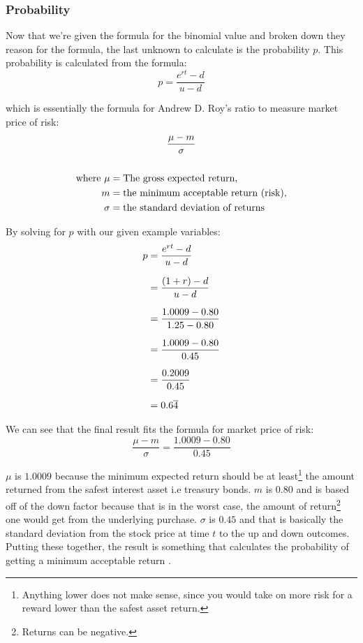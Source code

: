 \documentclass[12pt, letterpaper]{article}\usepackage{float}
\begin{document}
\subsubsection*{Probability}
Now that we're given the formula for the binomial value and broken down they reason for the formula, the last unknown to calculate is the probability ${p}$. This probability is calculated from the formula:
\begin{equation*}
  p = \frac{e^{rt} - d}{u - d}
\end{equation*}

\noindent which is essentially the formula for Andrew D. Roy's ratio \cite{riskneutralmeasurewikipedia, sharperatiowikipedia, royssafetyfirstcriterionwikipedia} to measure market price of risk:
\begin{gather}
  \setlength{\jot}{10pt}
  \frac{\mu - m}{\sigma} \\
  \\
  \begin{align*}
  \text{where}~\mu &= \text{The gross expected return}, \\
  m &= \text{the minimum acceptable return (risk)}, \\
  \sigma &= \text{the standard deviation of returns}
  \end{align*} \\
\end{gather}

\pagebreak
By solving for ${p}$ with our given example variables:
\begin{equation*}
  \setlength{\jot}{10pt}
  \begin{split}
    p
    & = \frac{e^{rt} - d}{u - d} \\
    & = \frac{(1+r) - d}{u - d} \\
    & = \frac{1.0009 - 0.80}{1.25 - 0.80} \\
    & = \frac{1.0009 - 0.80}{0.45} \\
    & = \frac{0.2009}{0.45} \\
    & = 0.6\overline{4}
  \end{split}
\end{equation*}

We can see that the final result fits the formula for market price of risk:
\begin{equation*}
  \frac{\mu - m}{\sigma} = \frac{1.0009 - 0.80}{0.45}
\end{equation*}

\noindent ${\mu}$ is ${1.0009}$ because the minimum expected return should be at least\footnote{Anything lower does not make sense, since you would take on more risk for a reward lower than the safest asset return.} the amount returned from the safest interest asset i.e treasury bonds. ${m}$ is ${0.80}$ and is based off of the down factor because that is in the worst case, the amount of return\footnote{Returns can be negative.} one would get from the underlying purchase. ${\sigma}$ is ${0.45}$ and that is basically the standard deviation from the stock price at time ${t}$ to the up and down outcomes. Putting these together, the result is something that calculates the probability of getting a minimum acceptable return \cite{sfratioinvestopedia}.
\end{document}
